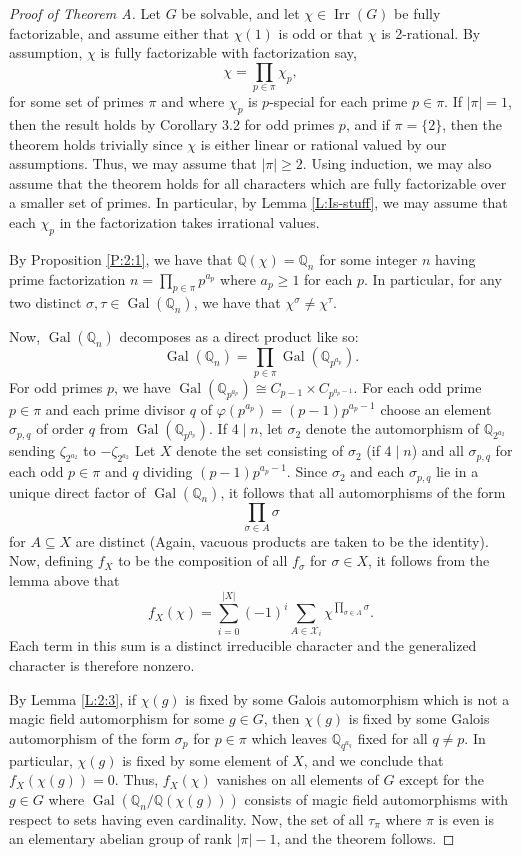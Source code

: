 \documentclass[12pt]{amsart}
\theoremstyle{definition}
\newcommand{\Q}{\mathbb{Q}}
\DeclareMathOperator{\Gal}{Gal}
\DeclareMathOperator{\Irr}{Irr}
\begin{document}
\begin{proof}[Proof of Theorem A]
	Let $G$ be solvable, and let $\chi \in \Irr(G)$ be fully factorizable, and assume either that $\chi(1)$ is odd or that $\chi$ is 2-rational. By assumption, $\chi$ is fully factorizable with factorization say,
	$$
		\chi = \prod_{p \in \pi} \chi_{p},
	$$
	for some set of primes $\pi$ and where $\chi_{p}$ is $p$-special for each prime $p \in \pi$. If $|\pi| = 1$, then the result holds by Corollary 3.2 for odd primes $p$, and if $\pi = \{2\}$, then the theorem holds trivially since $\chi$ is either linear or rational valued by our assumptions. Thus, we may assume that $|\pi| \geq 2$. Using induction, we may also assume that the theorem holds for all characters which are fully factorizable over a smaller set of primes. In particular, by Lemma \ref{L:Is-stuff}, we may assume that each $\chi_p$ in the factorization takes irrational values. 
	
	By Proposition \ref{P:2:1}, we have that $\Q(\chi) = \Q_n$ for some integer $n$ having prime factorization $n = \prod_{p \in \pi} p^{a_p}$ where $a_p \geq 1$ for each $p$. In particular, for any two distinct $\sigma, \tau \in \Gal(\Q_n)$, we have that $\chi^{\sigma} \neq \chi^\tau$.
	
	Now, $\Gal(\Q_n)$ decomposes as a direct product like so:
	$$
		\Gal(\Q_n) = \prod_{p \in \pi} \Gal(\Q_{p^{a_p}}).
	$$
	For odd primes $p$, we have $\Gal(\Q_{p^{a_p}}) \cong C_{p-1} \times C_{p^{a_p - 1}}$. For each odd prime $p \in \pi$ and each prime divisor $q$ of $\varphi(p^{a_p}) = (p-1)p^{a_p-1}$ choose an element $\sigma_{p,q}$ of order $q$ from $\Gal(\Q_{p^{a_p}})$. If $4 \mid n$, let $\sigma_2$ denote the automorphism of $\Q_{2^{a_2}}$ sending $\zeta_{2^{a_2}}$ to $-\zeta_{2^{a_2}}$ Let $X$ denote the set consisting of $\sigma_2$ (if $4 \mid n$) and all $\sigma_{p,q}$ for each odd $p \in \pi$ and $q$ dividing $(p-1)p^{a_p - 1}$. Since $\sigma_2$ and each $\sigma_{p,q}$ lie in a unique direct factor of $\Gal(\Q_n)$, it follows that all automorphisms of the form
	$$
		\prod_{\sigma \in A} \sigma 
	$$
	for $A \subseteq X$ are distinct (Again, vacuous products are taken to be the identity). Now, defining $f_X$ to be the composition of all $f_\sigma$ for $\sigma \in X$, it follows from the lemma above that
	$$
	f_X(\chi) = \sum_{i=0}^{|X|} (-1)^i\sum_{A \in \mathscr{X}_i}\chi^{\prod_{\sigma \in A}\sigma}.
	$$
	Each term in this sum is a distinct irreducible character and the generalized character is therefore nonzero. 
	
	By Lemma \ref{L:2:3}, if $\chi(g)$ is fixed by some 
	Galois automorphism which is not a magic field automorphism for some $g \in G$, then $\chi(g)$ is 
fixed by some Galois automorphism of the form $\sigma_p$ for $p \in \pi$ which leaves $\Q_{q^{a_q}}$ 
	fixed for all $q \neq p$. In particular, $\chi(g)$ is fixed by some element of $X$, and we conclude that
$f_X(\chi(g)) = 0$. Thus, $f_X(\chi)$ vanishes on all elements of $G$ except for the $g \in G$ where $\Gal(\Q_n/\Q(\chi(g)))$ 
consists of magic field automorphisms with respect to sets having even cardinality. Now, the set of all $\tau_\pi$ where $\pi$ is even is an elementary abelian group of rank $|\pi| - 1$, and the theorem follows.
\end{proof}
\end{document}

